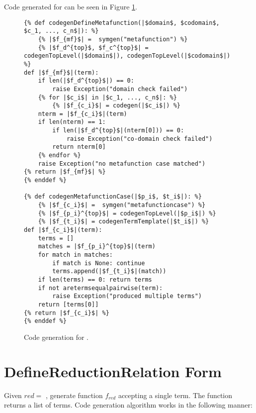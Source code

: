 Code generated for \DefineMetafunctionNoArgs \space can be seen in Figure \ref{codegen-define-metafunc}.
\begin{figure}
\begin{verbatim}
{% def codegenDefineMetafunction(|$domain$, $codomain$, $c_1, ..., c_n$|): %}
	{% |$f_{mf}$| =  symgen("metafunction") %}
	{% |$f_d^{top}$, $f_c^{top}$| = codegenTopLevel(|$domain$|), codegenTopLevel(|$codomain$|) %}
def |$f_{mf}$|(term):
	if len(|$f_d^{top}$|) == 0:
		raise Exception("domain check failed")
	{% for |$c_i$| in |$c_1, ..., c_n$|: %}
		{% |$f_{c_i}$| = codegen(|$c_i$|) %}
	nterm = |$f_{c_i}$|(term)
	if len(nterm) == 1:
		if len(|$f_d^{top}$|(nterm[0])) == 0:
			raise Exception("co-domain check failed")
		return nterm[0]
	{% endfor %}
	raise Exception("no metafunction case matched")
{% return |$f_{mf}$| %}
{% enddef %}

{% def codegenMetafunctionCase(|$p_i$, $t_i$|): %}
	{% |$f_{c_i}$| =  symgen("metafunctioncase") %}
	{% |$f_{p_i}^{top}$| = codegenTopLevel(|$p_i$|) %}
	{% |$f_{t_i}$| = codegenTermTemplate(|$t_i$|) %}
def |$f_{c_i}$|(term):
	terms = []
	matches = |$f_{p_i}^{top}$|(term)
	for match in matches:
		if match is None: continue
		terms.append(|$f_{t_i}$|(match))
	if len(terms) == 0: return terms
	if not aretermsequalpairwise(term):
		raise Exception("produced multiple terms")
	return [terms[0]]
{% return |$f_{c_i}$| %}
{% enddef %}
\end{verbatim}
\caption{Code generation for \DefineMetafunctionNoArgs.}
\label{codegen-define-metafunc}
\end{figure}

\section{DefineReductionRelation Form}
Given $red=$ \TlDefineReductionRelation, generate function $f_{red}$ accepting a single term. The function returns a list of terms. Code generation algorithm works in the following manner:

